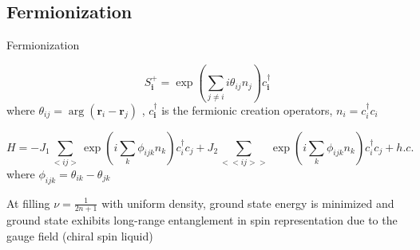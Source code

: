 \subsection{Fermionization}
\begin{frame}{Fermionization}
    \begin{block}{}
        \begin{equation*} 
            S_{\mathbf{i}}^{+}
            =
            \exp(\sum_{j \ne i} i \theta_{ij} n_j) c_{\mathbf{i}}^{\dagger}
        \end{equation*}
        where $\theta_{ij} = \arg (\mathbf{r}_i - \mathbf{r}_j)$%
        ,
        $c_{\mathbf{i}}^{\dagger}$ is the fermionic creation operators, $n_i = c_i^{\dagger} c_i$%
    \end{block}

    \begin{block}{}
        \begin{equation*}
            H = -J_1 \sum_{<ij>} \exp(i\sum_{k}\phi_{ijk} n_k) c^{\dagger}_{i} c_{j} + J_2 \sum_{<<ij>>} \exp(i\sum_{k}\phi_{ijk} n_k) c^{\dagger}_{i} c_{j} + h.c.
        \end{equation*}
        where $\phi_{ijk} = \theta_{ik} - \theta_{jk}$%
    \end{block}

    \begin{block}{}%
        At filling $\nu = \frac{1}{2n+1}$ with uniform density, ground state energy is minimized and ground state exhibits long-range entanglement in spin representation due to the gauge field (chiral spin liquid)
    \end{block}
\end{frame}
